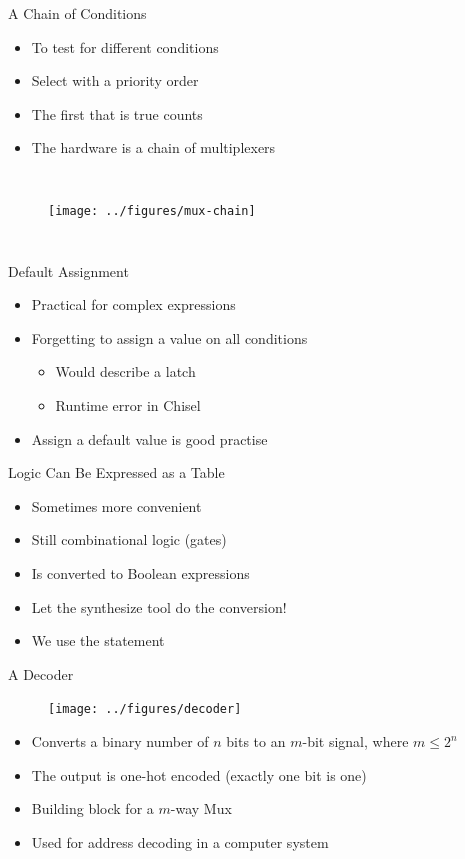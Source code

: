 \begin{frame}[fragile]{A Chain of Conditions}
\begin{itemize}
\item To test for different conditions
\item Select with a priority order
\item The first that is true counts
\item The hardware is a chain of multiplexers
\end{itemize}
\begin{columns}
\begin{figure}
  \texttt{[image: ../figures/mux-chain]}
\end{figure}
\end{columns}
\end{frame}

\begin{frame}[fragile]{Default Assignment}
\begin{itemize}
\item Practical for complex expressions
\item Forgetting to assign a value on all conditions
\begin{itemize}
\item Would describe a latch
\item Runtime error in Chisel
\end{itemize}
\item Assign a default value is good practise
\end{itemize}
\end{frame}

\begin{frame}[fragile]{Logic Can Be Expressed as a Table}
\begin{itemize}
\item Sometimes more convenient 
\item Still combinational logic (gates)
\item Is converted to Boolean expressions
\item Let the synthesize tool do the conversion!
\item We use the  statement
\end{itemize}
\end{frame}


\begin{frame}[fragile]{A Decoder}
\begin{figure}
  \texttt{[image: ../figures/decoder]}
\end{figure}
\begin{itemize}
\item Converts a binary number of $n$ bits to an $m$-bit signal, where $m \leq 2^n$
\item The output is one-hot encoded (exactly one bit is one)
\item Building block for a $m$-way Mux
\item Used for address decoding in a computer system
\end{itemize}
\end{frame}

